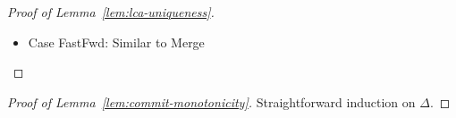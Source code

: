 \begin{proof}[Proof of Lemma~\ref{lem:lca-uniqueness}]
\begin{itemize}
    \item Case {\sc FastFwd}: Similar to {\sc Merge}

  \end{itemize}

\end{proof}

\begin{proof}[Proof of Lemma~\ref{lem:commit-monotonicity}]
  Straightforward induction on $\Delta$.
\end{proof}

